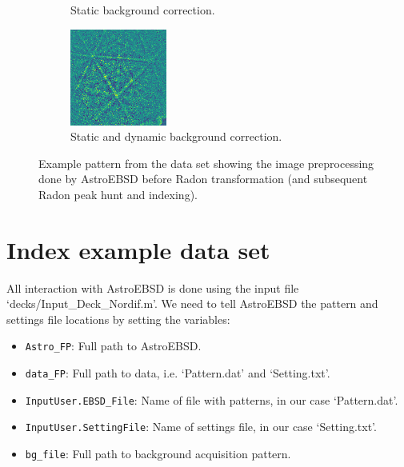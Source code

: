 \documentclass[11pt, twoside]{article}
\begin{document}
\begin{figure}[tb]
\begin{subfigure}[t]{0.33\columnwidth}
    \caption{Static background correction.}
    \label{fig:ebsp-static}
  \end{subfigure}
  \begin{subfigure}[t]{0.33\columnwidth}
    \includegraphics[width=1\columnwidth]{figurer/ebsp/ebsp_2_4_sd.png}
    \caption{Static and dynamic background correction.}
    \label{fig:ebsp-dynamic}
  \end{subfigure}
  \caption{Example pattern from the data set showing the image preprocessing done by AstroEBSD before Radon transformation (and subsequent Radon peak hunt and indexing).}
  \label{fig:ebsp}
\end{figure}


\section{Index example data set}

All interaction with AstroEBSD is done using the input file `decks/Input\_Deck\_Nordif.m'. We need to tell AstroEBSD the pattern and settings file locations by setting the variables:

\begin{itemize}
  \item \texttt{Astro\_FP}: Full path to AstroEBSD.
  \item \texttt{data\_FP}: Full path to data, i.e. `Pattern.dat' and `Setting.txt'.
  \item \texttt{InputUser.EBSD\_File}: Name of file with patterns, in our case `Pattern.dat'.
  \item \texttt{InputUser.SettingFile}: Name of settings file, in our case `Setting.txt'.
  \item \texttt{bg\_file}: Full path to background acquisition pattern.
\end{itemize}
\end{document}
